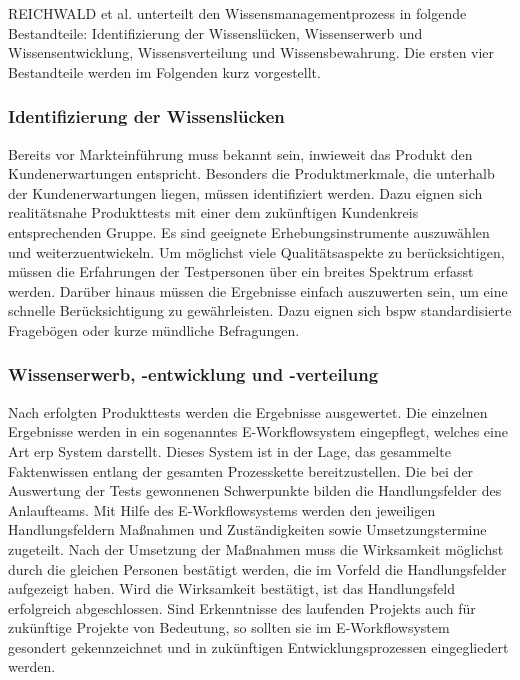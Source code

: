 REICHWALD et al. unterteilt den Wissensmanagementprozess in folgende Bestandteile: Identifizierung der Wissenslücken, Wissenserwerb und Wissensentwicklung, Wissensverteilung und Wissensbewahrung. Die ersten vier Bestandteile werden im Folgenden kurz vorgestellt. 

\subsubsection*{Identifizierung der Wissenslücken}
Bereits vor Markteinführung muss bekannt sein, inwieweit das Produkt den Kundenerwartungen entspricht. Besonders die Produktmerkmale, die unterhalb der Kundenerwartungen liegen, müssen identifiziert werden. Dazu eignen sich realitätsnahe Produkttests mit einer dem zukünftigen Kundenkreis entsprechenden Gruppe. Es sind geeignete Erhebungsinstrumente auszuwählen und weiterzuentwickeln. Um möglichst viele Qualitätsaspekte zu berücksichtigen, müssen die Erfahrungen der Testpersonen über ein breites Spektrum erfasst werden. Darüber hinaus müssen die Ergebnisse einfach auszuwerten sein, um eine schnelle Berücksichtigung zu gewährleisten. Dazu eignen sich \gls{bspw} standardisierte Fragebögen oder kurze mündliche Befragungen. 

\subsubsection*{Wissenserwerb, -entwicklung und -verteilung}
Nach erfolgten Produkttests werden die Ergebnisse ausgewertet. Die einzelnen Ergebnisse werden in ein sogenanntes E-Workflowsystem eingepflegt, welches eine Art \gls{erp} System darstellt.
Dieses System ist in der Lage, das gesammelte Faktenwissen entlang der gesamten Prozesskette bereitzustellen. Die bei der Auswertung der Tests gewonnenen Schwerpunkte bilden die Handlungsfelder des Anlaufteams. Mit Hilfe des E-Workflowsystems werden den jeweiligen Handlungsfeldern Maßnahmen und Zuständigkeiten sowie Umsetzungstermine zugeteilt. 
Nach der Umsetzung der Maßnahmen muss die Wirksamkeit möglichst durch die gleichen Personen bestätigt werden, die im Vorfeld die Handlungsfelder aufgezeigt haben. Wird die Wirksamkeit bestätigt, ist das Handlungsfeld erfolgreich abgeschlossen. 
Sind Erkenntnisse des laufenden Projekts auch für zukünftige Projekte von Bedeutung, so sollten sie im E-Workflowsystem gesondert gekennzeichnet und in zukünftigen Entwicklungsprozessen eingegliedert werden. 



